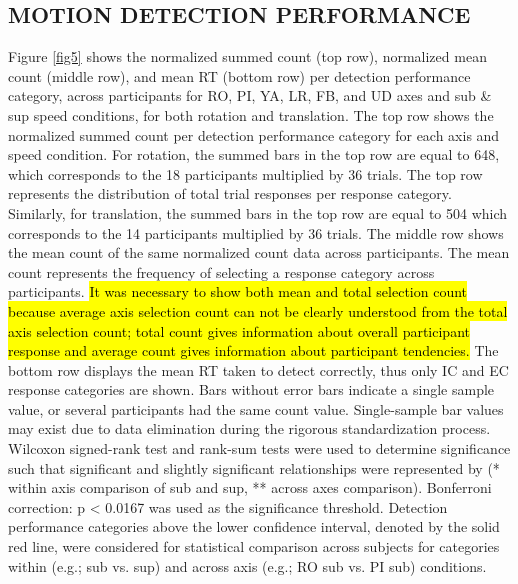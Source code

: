\documentclass{ieeeaccess}
\begin{document}
\subsection{MOTION DETECTION PERFORMANCE}
Figure \ref{fig5} shows the normalized summed count (top row), normalized mean count (middle row), and mean RT (bottom row) per detection performance category, across participants for RO, PI, YA, LR, FB, and UD axes and sub \& sup speed conditions, for both rotation and translation. The top row shows the normalized summed count per detection performance category for each axis and speed condition. For rotation, the summed bars in the top row are equal to 648, which corresponds to the 18 participants multiplied by 36 trials. The top row represents the distribution of total trial responses per response category. Similarly, for translation, the summed bars in the top row are equal to 504 which corresponds to the 14 participants multiplied by 36 trials. The middle row shows the mean count of the same normalized count data across participants. The mean count represents the frequency of selecting a response category across participants. \hl{It was necessary to show both mean and total selection count because average axis selection count can not be clearly understood from the total axis selection count; total count gives information about overall participant response and average count gives information about participant tendencies.} The bottom row displays the mean RT taken to detect correctly, thus only IC and EC response categories are shown. Bars without error bars indicate a single sample value, or several participants had the same count value. Single-sample bar values may exist due to data elimination during the rigorous standardization process. Wilcoxon signed-rank test and rank-sum tests were used to determine significance such that significant and slightly significant relationships were represented by (* within axis comparison of sub and sup, ** across axes comparison). Bonferroni correction: p < 0.0167 was used as the significance threshold. Detection performance categories above the lower confidence interval, denoted by the solid red line, were considered for statistical comparison across subjects for categories within (e.g.; sub vs. sup) and across axis (e.g.; RO sub vs. PI sub) conditions.
\end{document}
